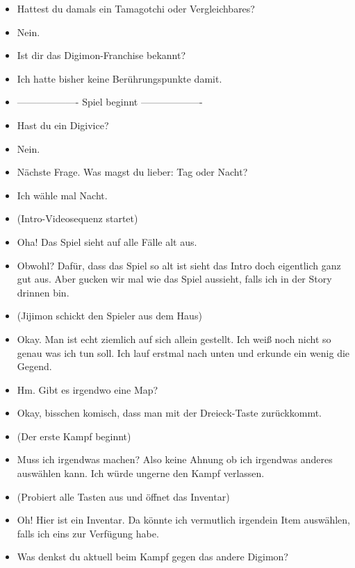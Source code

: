 {\begin{itemize}[]
    \item {} Hattest du damals ein Tamagotchi oder Vergleichbares?
    \item {} Nein.
    \item {} Ist dir das Digimon-Franchise bekannt?
    \item {} Ich hatte bisher keine Berührungspunkte damit.
    \item {-------------------} Spiel beginnt {-------------------}
    \item {} \frq Hast du ein Digivice?\flq{}
    \item {} Nein. 
    \item {} \frq Nächste Frage. Was magst du lieber: Tag oder Nacht?\flq{} 
    \item {} Ich wähle mal Nacht.
    \item {} (Intro-Videosequenz startet)
    \item {} Oha! Das Spiel sieht auf alle Fälle alt aus.
    \item {} Obwohl? Dafür, dass das Spiel so alt ist sieht das Intro doch eigentlich ganz gut aus. Aber gucken wir mal wie das Spiel aussieht, falls ich in der Story drinnen bin. 
    \item {} (Jijimon schickt den Spieler aus dem Haus)
    \item {} Okay. Man ist echt ziemlich auf sich allein gestellt. Ich weiß noch nicht so genau was ich tun soll. Ich lauf erstmal nach unten und erkunde ein wenig die Gegend.
    \item {} Hm. Gibt es irgendwo eine Map?
    \item {} Okay, bisschen komisch, dass man mit der Dreieck-Taste zurückkommt. 
    \item {} (Der erste Kampf beginnt)
    \item {} Muss ich irgendwas machen? Also keine Ahnung ob ich irgendwas anderes auswählen kann. Ich würde ungerne den Kampf verlassen.
    \item {} (Probiert alle Tasten aus und öffnet das Inventar)
    \item {} Oh! Hier ist ein Inventar. Da könnte ich vermutlich irgendein Item auswählen, falls ich eins zur Verfügung habe.
    \item {} Was denkst du aktuell beim Kampf gegen das andere Digimon?

\end{itemize}}
